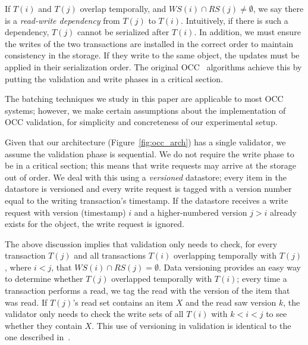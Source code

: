 If $T(i)$ and $T(j)$ overlap temporally, and $WS(i) \cap RS(j) \neq \emptyset$, we say there is a \emph{read-write dependency} from $T(j)$ to $T(i)$. Intuitively, if there is such a dependency, $T(j)$ cannot be serialized after $T(i)$. In addition, we must ensure the writes of the two transactions are installed in the correct order to maintain consistency in the storage. If they write to the same object, the updates must be applied in their serialization order. The original OCC~\cite{kung81tods} algorithms achieve this by putting the validation and write phases in a critical section.

The batching techniques we study in this paper are applicable to most OCC systems; however, we make certain assumptions about the implementation of OCC validation, for simplicity and concreteness of our experimental setup.

Given that our architecture (Figure~\ref{fig:occ_arch}) has a single validator, we assume the validation phase is sequential. We do not require the write phase to be in a critical section; this means that write requests may arrive at the storage out of order. We deal with this using a \emph{versioned} datastore; every item in the datastore is versioned and every write request is tagged with a version number equal to the writing transaction's timestamp. If the datastore receives a write request with version (timestamp) $i$ and a higher-numbered version $j > i$ already exists for the object, the write request is ignored. 

The above discussion implies that validation only needs to check, for every transaction $T(j)$ and all transactions $T(i)$ overlapping temporally with $T(j)$, where $i<j$, that $WS(i) \cap RS(j) = \emptyset$. Data versioning provides an easy way to determine whether $T(j)$ overlapped temporally with $T(i)$; every time a transaction performs a read, we tag the read with the version of the item that was read. If $T(j)$'s read set contains an item $X$ and the read saw version $k$, the validator only needs to check the write sets of all $T(i)$ with $k < i < j$ to see whether they contain $X$. This use of versioning in validation is identical to the one described in~\cite{ding2015centiman}.
